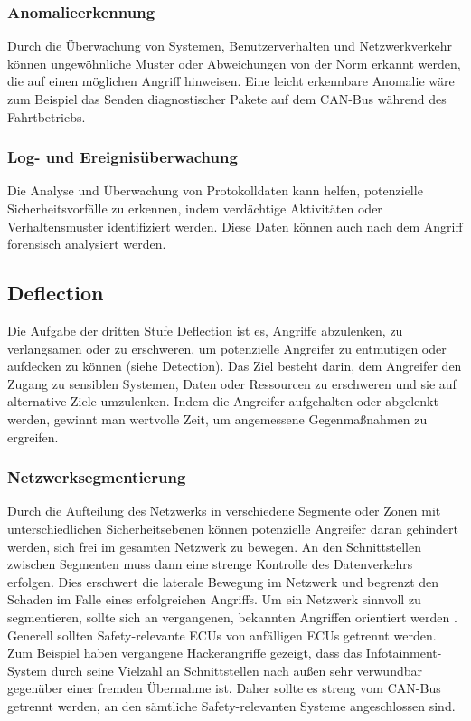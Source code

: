 \subsubsection{Anomalieerkennung}
Durch die Überwachung von Systemen, Benutzerverhalten und Netzwerkverkehr können ungewöhnliche Muster oder Abweichungen von der Norm erkannt werden, die auf einen möglichen Angriff hinweisen. Eine leicht erkennbare Anomalie wäre zum Beispiel das Senden diagnostischer Pakete auf dem \acs{CAN}-Bus während des Fahrtbetriebs.

\subsubsection{Log- und Ereignisüberwachung}
Die Analyse und Überwachung von Protokolldaten kann helfen, potenzielle Sicherheitsvorfälle zu erkennen, indem verdächtige Aktivitäten oder Verhaltensmuster identifiziert werden. Diese Daten können auch nach dem Angriff forensisch analysiert werden.




\subsection{Deflection}
Die Aufgabe der dritten Stufe Deflection ist es, Angriffe abzulenken, zu verlangsamen oder zu erschweren, um potenzielle Angreifer zu entmutigen oder aufdecken zu können (siehe Detection).
Das Ziel besteht darin, dem Angreifer den Zugang zu sensiblen Systemen, Daten oder Ressourcen zu erschweren und sie auf alternative Ziele umzulenken. Indem die Angreifer aufgehalten oder abgelenkt werden, gewinnt man wertvolle Zeit, um angemessene Gegenmaßnahmen zu ergreifen.

\subsubsection{Netzwerksegmentierung}
Durch die Aufteilung des Netzwerks in verschiedene Segmente oder Zonen mit unterschiedlichen Sicherheitsebenen können potenzielle Angreifer daran gehindert werden, sich frei im gesamten Netzwerk zu bewegen. An den Schnittstellen zwischen Segmenten muss dann eine strenge Kontrolle des Datenverkehrs erfolgen. Dies erschwert die laterale Bewegung im Netzwerk und begrenzt den Schaden im Falle eines erfolgreichen Angriffs. Um ein Netzwerk sinnvoll zu segmentieren, sollte sich an vergangenen, bekannten Angriffen orientiert werden \cite[145]{Wurm.2022}. Generell sollten Safety-relevante \acsp{ECU} von anfälligen \acsp{ECU} getrennt werden. Zum Beispiel haben vergangene Hackerangriffe gezeigt, dass das Infotainment-System durch seine Vielzahl an Schnittstellen nach außen sehr verwundbar gegenüber einer fremden Übernahme ist. Daher sollte es streng vom \acs{CAN}-Bus getrennt werden, an den sämtliche Safety-relevanten Systeme angeschlossen sind.

